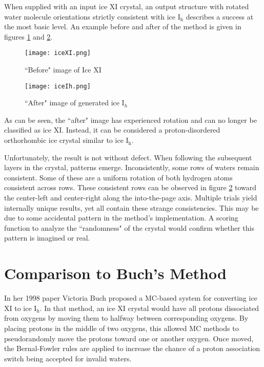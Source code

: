 When supplied with an input ice XI crystal, an output structure with rotated water molecule orientations strictly consistent with ice I$_{\mathrm{h}}$ describes a success at the most basic level.
An example before and after of the method is given in figures \ref{fig:iceXI} and \ref{fig:iceIh}.
\begin{figure}
	
	\centering
	
	\texttt{[image: iceXI.png]}
	
	\caption{``Before" image of Ice XI}
	
	\label{fig:iceXI}
	
\end{figure}
\begin{figure}
	
	\centering
	
	\texttt{[image: iceIh.png]}
	
	\caption{``After" image of generated ice I$_{h}$}
	
	\label{fig:iceIh}
	
\end{figure}
As can be seen, the ``after" image has experienced rotation and can no longer be classified as ice XI. 
Instead, it can be considered a proton-disordered orthorhombic ice crystal similar to ice I$_{\mathrm{h}}$. 

Unfortunately, the result is not without defect.
When following the subsequent layers in the crystal, patterns emerge. 
Inconsistently, some rows of waters remain consistent.
Some of these are a uniform rotation of both hydrogen atoms consistent across rows.
These consistent rows can be observed in figure \ref{fig:iceIh} toward the center-left and center-right along the into-the-page axis.
Multiple trials yield internally unique results, yet all contain these strange consistencies.
This may be due to some accidental pattern in the method's implementation.
A scoring function to analyze the ``randomness" of the crystal would confirm whether this pattern is imagined or real.

%
%
%
%
\section{Comparison to Buch's Method}

In her 1998 paper Victoria Buch proposed a MC-based system for converting ice XI to ice I$\mathrm{_{h}}$.\cite{MCIce} 
In that method, an ice XI crystal would have all protons dissociated from oxygens by moving them to halfway between corresponding oxygens.
By placing protons in the middle of two oxygens, this allowed MC methods to pseudorandomly move the protons toward one or another oxygen.
Once moved, the Bernal-Fowler rules are applied to increase the chance of a proton association switch being accepted for invalid waters.

